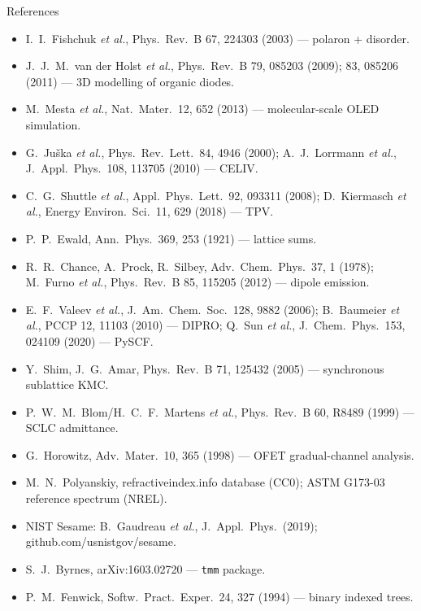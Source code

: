 \documentclass[aspectratio=169,10pt]{beamer}
\begin{document}
\begin{frame}[allowframebreaks]{References}
\begin{itemize}
\item I.\ I.\ Fishchuk \emph{et al.}, Phys.\ Rev.\ B 67, 224303 (2003) --- polaron + disorder.
\item J.\ J.\ M.\ van der Holst \emph{et al.}, Phys.\ Rev.\ B 79, 085203 (2009); 83, 085206 (2011) --- 3D modelling of organic diodes.
\item M.\ Mesta \emph{et al.}, Nat.\ Mater.\ 12, 652 (2013) --- molecular-scale OLED simulation.
\item G.\ Juška \emph{et al.}, Phys.\ Rev.\ Lett.\ 84, 4946 (2000); A.\ J.\ Lorrmann \emph{et al.}, J.\ Appl.\ Phys.\ 108, 113705 (2010) --- CELIV.
\item C.\ G.\ Shuttle \emph{et al.}, Appl.\ Phys.\ Lett.\ 92, 093311 (2008); D.\ Kiermasch \emph{et al.}, Energy Environ.\ Sci.\ 11, 629 (2018) --- TPV.
\item P.\ P.\ Ewald, Ann.\ Phys.\ 369, 253 (1921) --- lattice sums.
\item R.\ R.\ Chance, A.\ Prock, R.\ Silbey, Adv.\ Chem.\ Phys.\ 37, 1 (1978); M.\ Furno \emph{et al.}, Phys.\ Rev.\ B 85, 115205 (2012) --- dipole emission.
\item E.\ F.\ Valeev \emph{et al.}, J.\ Am.\ Chem.\ Soc.\ 128, 9882 (2006); B.\ Baumeier \emph{et al.}, PCCP 12, 11103 (2010) --- DIPRO; Q.\ Sun \emph{et al.}, J.\ Chem.\ Phys.\ 153, 024109 (2020) --- PySCF.
\item Y.\ Shim, J.\ G.\ Amar, Phys.\ Rev.\ B 71, 125432 (2005) --- synchronous sublattice KMC.
\item P.\ W.\ M.\ Blom/H.\ C.\ F.\ Martens \emph{et al.}, Phys.\ Rev.\ B 60, R8489 (1999) --- SCLC admittance.
\item G.\ Horowitz, Adv.\ Mater.\ 10, 365 (1998) --- OFET gradual-channel analysis.
\item M.\ N.\ Polyanskiy, refractiveindex.info database (CC0); ASTM G173-03 reference spectrum (NREL).
\item NIST Sesame: B.\ Gaudreau \emph{et al.}, J.\ Appl.\ Phys.\ (2019); github.com/usnistgov/sesame.
\item S.\ J.\ Byrnes, arXiv:1603.02720 --- \texttt{tmm} package.
\item P.\ M.\ Fenwick, Softw.\ Pract.\ Exper.\ 24, 327 (1994) --- binary indexed trees.
\end{itemize}
\end{frame}
\end{document}
